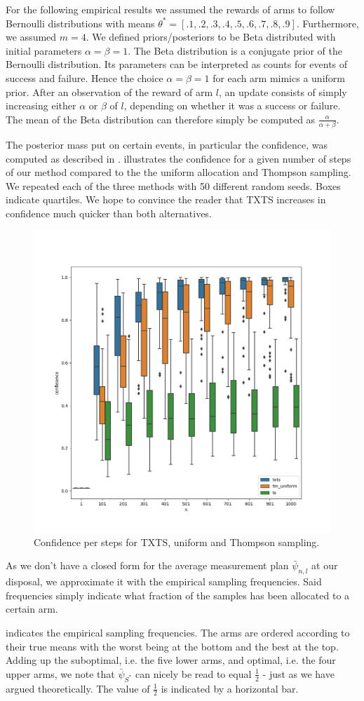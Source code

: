 For the following empirical results we assumed the rewards of arms to follow
Bernoulli distributions with means $\theta^* = [.1, .2, .3, .4, .5, .6, .7, .8,
.9]$. Furthermore, we assumed $m=4$. We defined priors/posteriors to be Beta
distributed with initial parameters $\alpha = \beta = 1$. The Beta distribution
is a conjugate prior of the Bernoulli distribution. Its parameters can be
interpreted as counts for events of success and failure. Hence the choice
$\alpha = \beta = 1$ for each arm mimics a uniform prior. After an observation
of the reward of arm $l$, an update consists of simply increasing either
$\alpha$ or $\beta$ of $l$, depending on whether it was a success or failure.
The mean of the Beta distribution can therefore simply be computed as
$\frac{\alpha}{\alpha + \beta}$.

The posterior mass put on certain events, in particular the confidence, was
computed as described in . 
illustrates the confidence for a given number of steps of our method compared to
the the uniform allocation and Thompson sampling. We repeated each of the three
methods with 50 different random seeds. Boxes indicate quartiles. We
hope to convince the reader that TXTS increases in confidence much quicker than
both alternatives.
\begin{figure}[h]
  \centering
  \includegraphics[width=.5\textwidth]{190723-confidences.png}
  \caption{Confidence per steps for TXTS, uniform and Thompson sampling.}
  \label{fig:confidences}
\end{figure}

As we don't have a closed form for the average measurement plan
$\bar{\psi}_{n,l}$ at our disposal, we approximate it with the empirical
sampling frequencies. Said frequencies simply indicate what fraction of the
samples has been allocated to a certain arm.

 indicates the empirical sampling frequencies. The
arms are ordered according to their true means with the worst being at the
bottom and the best at the top. Adding up the suboptimal, i.e. the five lower
arms, and optimal, i.e. the four upper arms, we note that $\bar{\psi}_{S^*}$ can
nicely be read to equal $\frac{1}{2}$ - just as we have argued theoretically.
The value of $\frac{1}{2}$ is indicated by a horizontal bar.

